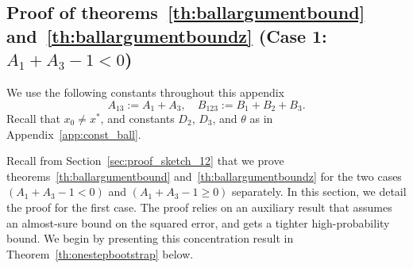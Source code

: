 \documentclass{article}
\begin{document}
\subsection{Proof of theorems~\ref{th:ballargumentbound} and~\ref{th:ballargumentboundz} (Case 1: $A_1 + A_3 - 1 < 0$)}\label{app:onestepconc}

We use the following constants throughout this appendix 
\[A_{13} := A_1+A_3, \quad B_{123} := B_1 + B_2 + B_3.\]
Recall that $x_0 \ne x^*$, and constants $D_2$, $D_3$, and $\theta$ as in Appendix~\ref{app:const_ball}.

\smallskip

Recall from Section~\ref{sec:proof_sketch_12} that we prove theorems~\ref{th:ballargumentbound} and~\ref{th:ballargumentboundz} for the two cases $(A_1 + A_3 - 1 < 0)$ and $(A_1 + A_3 - 1 \ge 0)$ separately. In this section, we detail the proof for the first case. The proof relies on an auxiliary result that assumes an almost-sure bound on the squared error, and gets a tighter high-probability bound. We begin by presenting this concentration result in Theorem~\ref{th:onestepbootstrap} below. 
\end{document}
